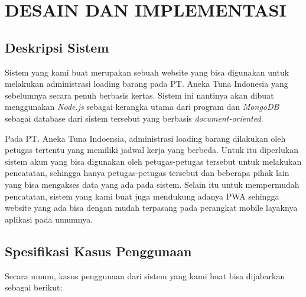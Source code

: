 \chapter{DESAIN DAN IMPLEMENTASI}
\vspace{4ex}

\setlength{\parindent}{7ex}


\section{Deskripsi Sistem}
\vspace{1ex}

Sistem yang kami buat merupakan sebuah website yang bisa digunakan untuk melakukan administrasi loading barang pada PT. Aneka Tuna Indonesia yang sebelumnya secara penuh berbasis kertas.
Sistem ini nantinya akan dibuat menggunakan \emph{Node.js} sebagai kerangka utama dari program dan \emph{MongoDB} sebagai database dari sistem tersebut yang berbasis \emph{document-oriented}.
\vspace{0.5ex}

Pada PT. Aneka Tuna Indoensia, administrasi loading barang dilakukan oleh petugas tertentu yang memiliki jadwal kerja yang berbeda.
Untuk itu diperlukan sistem akun yang bisa digunakan oleh petugas-petugas tersebut untuk melakukan pencatatan, sehingga hanya petugas-petugas tersebut dan beberapa pihak lain yang bisa mengakses data yang ada pada sistem.
Selain itu untuk mempermudah pencatatan, sistem yang kami buat juga mendukung adanya PWA sehingga website yang ada bisa dengan mudah terpasang pada perangkat mobile layaknya aplikasi pada umumnya.
\vspace{0.5ex}

\section{Spesifikasi Kasus Penggunaan}

Secara umum, kasus penggunaan dari sistem yang kami buat bisa dijabarkan sebagai berikut:
\vspace{0.5ex}

